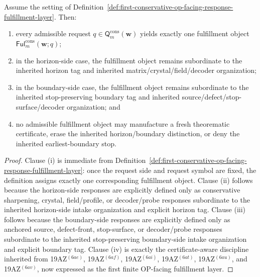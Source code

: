\begin{proposition}
\label{prop:every-admissible-conservative-op-facing-request-yields-exactly-one-route-faithful-conservative-fulfillment-object}
Assume the setting of Definition~\ref{def:first-conservative-op-facing-response-fulfillment-layer}. Then:
\begin{enumerate}[label=(\roman*)]
 \item every admissible request \(q\in\mathsf{Q}^{\mathrm{cons}}_{m}(\mathbf w)\) yields exactly one fulfillment object \(\mathsf{Ful}^{\mathrm{cons}}_{m}(\mathbf w;q)\);
 \item in the horizon-side case, the fulfillment object remains subordinate to the inherited horizon tag and inherited matrix/crystal/field/decoder organization;
 \item in the boundary-side case, the fulfillment object remains subordinate to the inherited stop-preserving boundary tag and inherited source/defect/stop-surface/decoder organization; and
 \item no admissible fulfillment object may manufacture a fresh theorematic certificate, erase the inherited horizon/boundary distinction, or deny the inherited earliest-boundary stop.
\end{enumerate}
\end{proposition}

\begin{proof}
Clause (i) is immediate from Definition~\ref{def:first-conservative-op-facing-response-fulfillment-layer}: once the request side and request symbol are fixed, the definition assigns exactly one corresponding fulfillment object. Clause (ii) follows because the horizon-side responses are explicitly defined only as conservative sharpening, crystal, field/profile, or decoder/probe responses subordinate to the inherited horizon-side intake organization and explicit horizon tag. Clause (iii) follows because the boundary-side responses are explicitly defined only as anchored source, defect-front, stop-surface, or decoder/probe responses subordinate to the inherited stop-preserving boundary-side intake organization and explicit boundary tag. Clause (iv) is exactly the certificate-aware discipline inherited from 19AZ$^{(6ae)}$, 19AZ$^{(6af)}$, 19AZ$^{(6ai)}$, 19AZ$^{(6at)}$, 19AZ$^{(6au)}$, and 19AZ$^{(6av)}$, now expressed as the first finite OP-facing fulfillment layer.
\end{proof}

